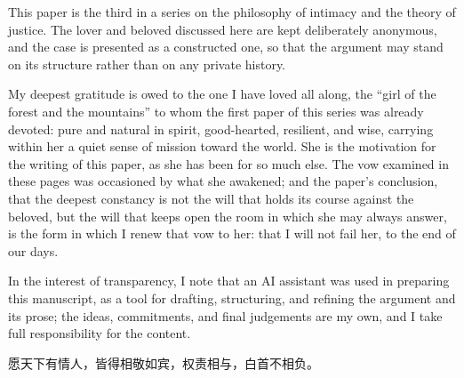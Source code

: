 This paper is the third in a series on the philosophy of intimacy and the theory of justice. The lover and beloved discussed here are kept deliberately anonymous, and the case is presented as a constructed one, so that the argument may stand on its structure rather than on any private history.

My deepest gratitude is owed to the one I have loved all along, the ``girl of the forest and the mountains'' to whom the first paper of this series was already devoted: pure and natural in spirit, good-hearted, resilient, and wise, carrying within her a quiet sense of mission toward the world. She is the motivation for the writing of this paper, as she has been for so much else. The vow examined in these pages was occasioned by what she awakened; and the paper's conclusion, that the deepest constancy is not the will that holds its course against the beloved, but the will that keeps open the room in which she may always answer, is the form in which I renew that vow to her: that I will not fail her, to the end of our days.

In the interest of transparency, I note that an AI assistant was used in preparing this manuscript, as a tool for drafting, structuring, and refining the argument and its prose; the ideas, commitments, and final judgements are my own, and I take full responsibility for the content.

\begin{center}
{\cjkfont\color{rosedeep} 愿天下有情人，皆得相敬如宾，权责相与，白首不相负。}
\end{center}

